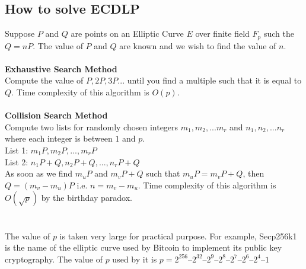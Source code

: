 \documentclass[a4paper,12pt]{report}
\begin{document}
\subsection{How to solve ECDLP}
Suppose  $P$ and $Q$ are points on an Elliptic Curve $E$ over finite field $F_p$ such the $Q=nP$. The value of $P$ and $Q$ are known and we wish to find the value of $n$.\\\\
\textbf{Exhaustive Search Method}\\
Compute the value of $P,2P,3P...$ until you find a multiple such that it is equal to $Q$. Time complexity of this algorithm is $O(p)$.\\\\
\textbf{Collision Search Method}\\
Compute two lists for randomly chosen integers $m_1, m_2, . . .m_r$ and $n_1, n_2, . . .n_r$ where each integer is between $1$ and $p$.\\
List 1: $m_1 P, m_2 P, . . .,m_r P$\\
List 2: $n_1 P + Q, n_2 P + Q, . . ., n_r P + Q$\\
As soon as we find $m_u P$ and $m_v P + Q$ such that $m_u P = m_v P + Q$, then $Q = (m_v - m_u) P $ i.e. $n=m_v - m_u$. Time complexity of this algorithm is $O(\sqrt{p})$ by the birthday paradox.\\\\\\
The value of $p$ is taken very large for practical purpose. For example, Secp256k1 is the name of the elliptic curve used by Bitcoin to implement its public key cryptography. The value of $p$ used by it is $p = 2^{256} – 2^{32} – 2^9 – 2^8 – 2^7 – 2^6 – 2^4 – 1$
\end{document}
